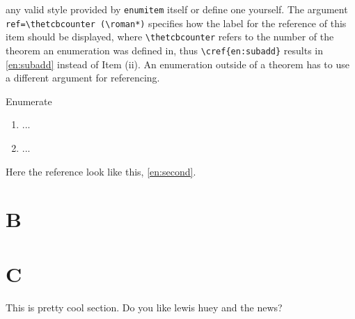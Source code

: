 any valid style provided by \texttt{enumitem} itself or define one yourself. 
The argument 
\lstinline[language={[LaTeX]TeX}]|ref=\thetcbcounter (\roman*)|
specifies how the label for 
the reference of this item should be displayed, where \lstinline[language={[LaTeX]TeX}]|\thetcbcounter| 
refers to the number of the theorem an enumeration was defined in, thus 
\lstinline[language={[LaTeX]TeX}]|\cref{en:subadd}| results in \cref{en:subadd} 
instead of \textcolor{\colmain}{Item (ii)}. An enumeration outside of a theorem has to use a different
argument for referencing.
\begin{lstbox}[]{Enumerate}
\begin{enumerate}[label=(K\theenumi), ref=MyEnum (K\theenumi)]
\item ... %
\item\label{en:second} ... %
\end{enumerate} 
\end{lstbox}
Here the reference look like this, \cref{en:second}.

\section{B}
\kant
{}
\pagediagram
\section{C}
This is pretty cool section.\newpage
Do you like lewis huey and the news?